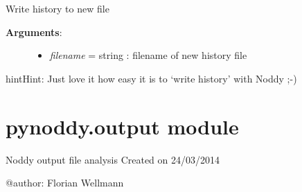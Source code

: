 \documentclass[letterpaper,10pt,english]{sphinxmanual}
\begin{document}
\begin{fulllineitems}
\begin{fulllineitems}
\begin{description}
\begin{itemize}
\end{itemize}

\end{description}

\end{fulllineitems}


\begin{fulllineitems}
\label{pynoddy:pynoddy.history.NoddyHistory.write_history}
Write history to new file
\begin{description}
\item[{\textbf{Arguments}:}] \leavevmode\begin{itemize}
\item {} 
\emph{filename} = string : filename of new history file

\end{itemize}

\end{description}

\begin{notice}{hint}{Hint:}
Just love it how easy it is to `write history' with Noddy ;-)
\end{notice}

\end{fulllineitems}


\end{fulllineitems}



\section{pynoddy.output module}
\label{pynoddy:module-pynoddy.output}\label{pynoddy:pynoddy-output-module}
Noddy output file analysis
Created on 24/03/2014

@author: Florian Wellmann
\end{document}
